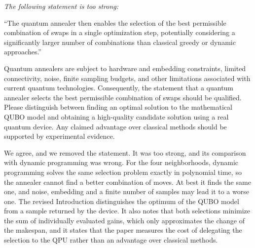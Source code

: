 \documentclass[12pt]{article}
\newenvironment{rc}[1]{\par\medskip\noindent\itshape\renewcommand{\emph}[1]{\textbf{##1}}\ignorespaces}{\par}
\newcommand{\answer}[1]{\par\smallskip\noindent #1\par}
\begin{document}
\begin{rc}{R2.1d --- Claim about the quantum annealer}
The following statement is too strong:

``The quantum annealer then enables the selection of the best permissible combination of swaps in a single optimization step, potentially considering a significantly larger number of combinations than classical greedy or dynamic approaches.''

Quantum annealers are subject to hardware and embedding constraints, limited connectivity, noise, finite sampling budgets, and other limitations associated with current quantum technologies. Consequently, the statement that a quantum annealer selects the best permissible combination of swaps should be qualified. Please distinguish between finding an optimal solution to the mathematical QUBO model and obtaining a high-quality candidate solution using a real quantum device. Any claimed advantage over classical methods should be supported by experimental evidence.
\end{rc}
\answer{We agree, and we removed the statement. It was too strong, and its comparison with dynamic programming was wrong. For the four neighborhoods, dynamic programming solves the same selection problem exactly in polynomial time, so the annealer cannot find a better combination of moves. At best it finds the same one, and noise, embedding and a finite number of samples may lead it to a worse one. The revised Introduction distinguishes the optimum of the QUBO model from a sample returned by the device. It also notes that both selections minimize the sum of individually evaluated gains, which only approximates the change of the makespan, and it states that the paper measures the cost of delegating the selection to the QPU rather than an advantage over classical methods.}
\end{document}
